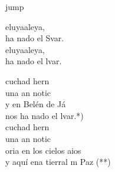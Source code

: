 \begin{cancion}jump\\
	\begin{chorus}%
		eluyaaleya,\\
		ha nado el Svar.\\
		eluyaaleya,\\
		ha nado el lvar.\jump\\
	\end{chorus}%
	cuchad hern \\
	una an notic  \\
	y en Belén de Já\\
	nos ha nado el lvar.*)\\
	\jump
	cuchad hern \\
	una an notic   \\
	oria en los cielos aios\\
	y aquí ena tierral m Paz (**)\\
\end{cancion}%
